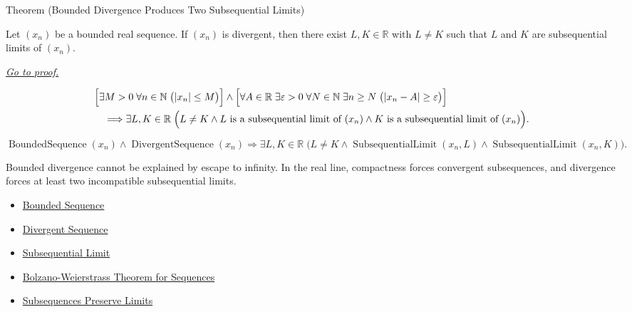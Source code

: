 
\begin{theorembox}{Theorem (Bounded Divergence Produces Two Subsequential Limits)}
\begin{theorem}
\label{thm:bounded-divergence-produces-two-subsequential-limits}
Let $(x_n)$ be a bounded real sequence. If $(x_n)$ is divergent, then
there exist $L,K\in\mathbb{R}$ with $L\ne K$ such that $L$ and $K$ are
subsequential limits of $(x_n)$.

\smallskip
\noindent
\hyperref[prf:bounded-divergence-produces-two-subsequential-limits]{\textit{Go to proof.}}
\end{theorem}
\end{theorembox}

\begin{remark*}
\[
\begin{aligned}
&\Bigl[
  \exists M>0\;\forall n\in\mathbb{N}\;\bigl(|x_n|\le M\bigr)
\Bigr]
\land
\Bigl[
  \forall A\in\mathbb{R}\;\exists \varepsilon>0\;\forall N\in\mathbb{N}
  \;\exists n\ge N\;\bigl(|x_n-A|\ge\varepsilon\bigr)
\Bigr]\\
&\quad\Longrightarrow
\exists L,K\in\mathbb{R}\;
\Bigl(
  L\ne K
  \land L\text{ is a subsequential limit of }(x_n)
  \land K\text{ is a subsequential limit of }(x_n)
\Bigr).
\end{aligned}
\]
\end{remark*}

\begin{remark*}
\[
\operatorname{BoundedSequence}(x_n)
\land
\operatorname{DivergentSequence}(x_n)
\Longrightarrow
\exists L,K\in\mathbb{R}\;
\bigl(
  L\ne K
  \land \operatorname{SubsequentialLimit}(x_n,L)
  \land \operatorname{SubsequentialLimit}(x_n,K)
\bigr).
\]
\end{remark*}

\begin{remark*}[Interpretation]
Bounded divergence cannot be explained by escape to infinity. In the real
line, compactness forces convergent subsequences, and divergence forces at
least two incompatible subsequential limits.
\end{remark*}

\begin{remark*}[Dependencies]\hfill
\begin{itemize}
  \item \hyperref[def:bounded-sequence]{Bounded Sequence}
  \item \hyperref[def:divergent-sequence]{Divergent Sequence}
  \item \hyperref[def:subsequential-limit]{Subsequential Limit}
  \item \hyperref[thm:bolzano-weierstrass-sequences]{Bolzano-Weierstrass Theorem for Sequences}
  \item \hyperref[thm:subsequences-preserve-limits]{Subsequences Preserve Limits}
\end{itemize}
\end{remark*}